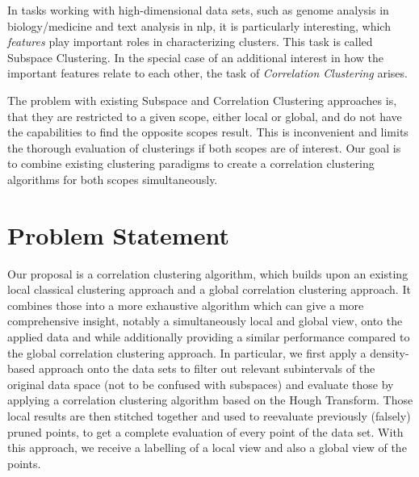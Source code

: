 In tasks working with high-dimensional data sets, such as genome analysis in biology/medicine and text analysis in \gls{nlp}, it is particularly interesting, which \textit{features} play important roles in characterizing clusters. This task is called Subspace Clustering. In the special case of an additional interest in how the important features relate to each other, the task of \textit{Correlation Clustering} arises.

The problem with existing Subspace and Correlation Clustering approaches is, that they are restricted to a given scope, either local or global, and do not have the capabilities to find the opposite scopes result. This is inconvenient and limits the thorough evaluation of clusterings if both scopes are of interest. Our goal is to combine existing clustering paradigms to create a correlation clustering algorithms for both scopes simultaneously.





\section{Problem Statement}
Our proposal is a correlation clustering algorithm, which builds upon an existing local classical clustering approach and a global correlation clustering approach. It combines those into a more exhaustive algorithm which can give a more comprehensive insight, notably a simultaneously local and global view, onto the applied data and while additionally providing a similar performance compared to the global correlation clustering approach. In particular, we first apply a density-based approach onto the data sets to filter out relevant subintervals of the original data space (not to be confused with subspaces) and evaluate those by applying a correlation clustering algorithm based on the Hough Transform. Those local results are then stitched together and used to reevaluate previously (falsely) pruned points, to get a complete evaluation of every point of the data set. With this approach, we receive a labelling of a local view and also a global view of the points. 

